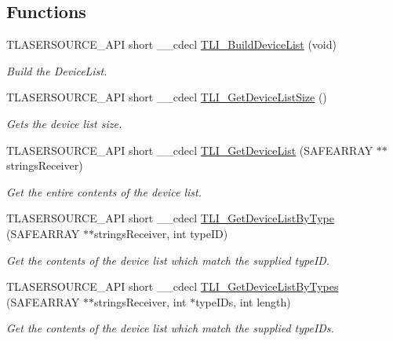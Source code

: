 \subsection*{Functions}
\begin{DoxyCompactItemize}
\item 
T\+L\+A\+S\+E\+R\+S\+O\+U\+R\+C\+E\+\_\+\+A\+PI short \+\_\+\+\_\+cdecl \hyperlink{group___t_cube_laser_source_ga7b8914b661250a203fc02d25530c41f8}{T\+L\+I\+\_\+\+Build\+Device\+List} (void)
\begin{DoxyCompactList}\small\item\em Build the Device\+List. \end{DoxyCompactList}\item 
T\+L\+A\+S\+E\+R\+S\+O\+U\+R\+C\+E\+\_\+\+A\+PI short \+\_\+\+\_\+cdecl \hyperlink{group___t_cube_laser_source_ga3a96c8b6190e2390c12905f9cd7fc879}{T\+L\+I\+\_\+\+Get\+Device\+List\+Size} ()
\begin{DoxyCompactList}\small\item\em Gets the device list size. \end{DoxyCompactList}\item 
T\+L\+A\+S\+E\+R\+S\+O\+U\+R\+C\+E\+\_\+\+A\+PI short \+\_\+\+\_\+cdecl \hyperlink{group___t_cube_laser_source_ga8e2879af61d2e943f70fafe0e26c6f0a}{T\+L\+I\+\_\+\+Get\+Device\+List} (S\+A\+F\+E\+A\+R\+R\+AY $\ast$$\ast$strings\+Receiver)
\begin{DoxyCompactList}\small\item\em Get the entire contents of the device list. \end{DoxyCompactList}\item 
T\+L\+A\+S\+E\+R\+S\+O\+U\+R\+C\+E\+\_\+\+A\+PI short \+\_\+\+\_\+cdecl \hyperlink{group___t_cube_laser_source_ga6faf7d6eac2402769d50a093773c4e49}{T\+L\+I\+\_\+\+Get\+Device\+List\+By\+Type} (S\+A\+F\+E\+A\+R\+R\+AY $\ast$$\ast$strings\+Receiver, int type\+ID)
\begin{DoxyCompactList}\small\item\em Get the contents of the device list which match the supplied type\+ID. \end{DoxyCompactList}\item 
T\+L\+A\+S\+E\+R\+S\+O\+U\+R\+C\+E\+\_\+\+A\+PI short \+\_\+\+\_\+cdecl \hyperlink{group___t_cube_laser_source_ga9f9e98361e0deb7125c0a3a85e88fda8}{T\+L\+I\+\_\+\+Get\+Device\+List\+By\+Types} (S\+A\+F\+E\+A\+R\+R\+AY $\ast$$\ast$strings\+Receiver, int $\ast$type\+I\+Ds, int length)
\begin{DoxyCompactList}\small\item\em Get the contents of the device list which match the supplied type\+I\+Ds. \end{DoxyCompactList}\item 
$$
\end{DoxyCompactItemize}
